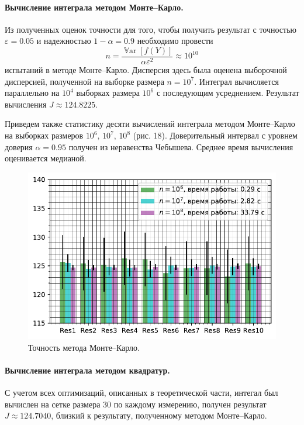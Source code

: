 \documentclass[16pt]{article}
\DeclareMathOperator*{\Var}{\mathbb{V}ar}
\begin{document}
\paragraph{Вычисление интеграла методом Монте--Карло.} Из полученных оценок точности для того, чтобы получить результат с точностью $\varepsilon = 0.05$ и надежностью $1 - \alpha = 0.9$ необходимо провести
$$n = \dfrac{\Var[f(Y)]}{\alpha\varepsilon^2} \approx 10^{10}$$
испытаний в методе Монте--Карло. Дисперсия здесь была оценена выборочной дисперсией, полученной на выборке размера $n = 10^7$. Интеграл вычисляется параллельно на $10^4$ выборках размера $10^{6}$ с последующим усреднением. Результат вычисления $J \approx 124.8225.$

Приведем также статистику десяти вычислений интеграла методом Монте--Карло на выборках размеров $10^6,\, 10^7,\, 10^8$ (рис. 18). Доверительный интервал с уровнем доверия $\alpha = 0.95$ получен из неравенства Чебышева. Среднее время вычисления оценивается медианой.

\begin{figure}[h]
	\center
	\includegraphics[scale=1]{6_1.pdf}
	\caption{Точность метода Монте--Карло.}
\end{figure} 

\paragraph{Вычисление интеграла методом квадратур.} С учетом всех оптимизаций, описанных в теоретической части, интегал был вычислен на сетке размера $30$ по каждому измерению, получен результат $J \approx 124.7040$, близкий к результату, полученному методом Монте--Карло.
\end{document}
